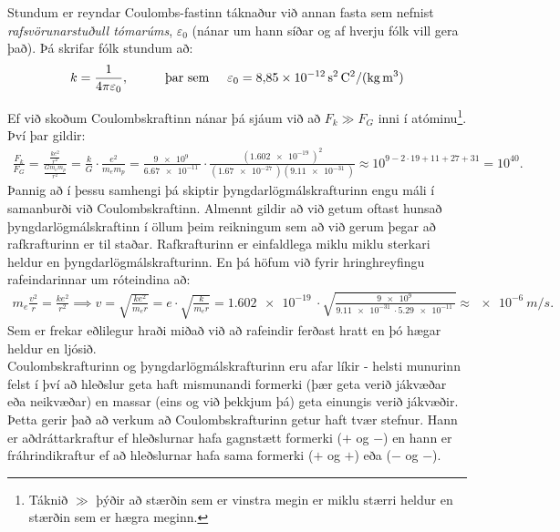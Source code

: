 \ifdefined \wholebook \else\documentclass[oneside]{book}\usepackage{EdlBook}\graphicspath{{figures/}}
\begin{document}
Stundum er reyndar Coulombs-fastinn táknaður við annan fasta sem nefnist \textit{rafsvörunarstuðull tómarúms}, $\varepsilon_0$ (nánar um hann síðar og af hverju fólk vill gera það). Þá skrifar fólk stundum að:
\begin{align*}
    k = \frac{1}{4\pi \varepsilon_0}, \hspace{1cm} \text{þar sem} \hspace{0.5cm} \varepsilon_0 = \SI{8.85e-12}{s^2.C^2/(kg.m^3)}
\end{align*}


Ef við skoðum Coulombskraftinn nánar þá sjáum við að $F_k \gg F_G$ inni í atóminu\footnote{Táknið $\gg$ þýðir að stærðin sem er vinstra megin er miklu stærri heldur en stærðin sem er hægra meginn.}. Því þar gildir:
\begin{align*}
    \frac{F_k}{F_G} = \frac{\frac{ke^2}{r^2}}{\frac{Gm_em_p}{r^2}} = \frac{k}{G} \cdot \frac{e^2}{m_e m_p} = \frac{\SI{9e9}{}}{\SI{6.67e-11}{}} \cdot \frac{(\SI{1.602e-19}{})^2}{(\SI{1.67e-27}{})(\SI{9.11e-31}{})} \approx 10^{9-2\cdot19 + 11 + 27+31} = 10^{40}.
\end{align*}
Þannig að í þessu samhengi þá skiptir þyngdarlögmálskrafturinn engu máli í samanburði við Coulombskraftinn. Almennt gildir að við getum oftast hunsað þyngdarlögmálskraftinn í öllum þeim reikningum sem að við gerum þegar að rafkrafturinn er til staðar. Rafkrafturinn er einfaldlega miklu miklu sterkari heldur en þyngdarlögmálskrafturinn. En þá höfum við fyrir hringhreyfingu rafeindarinnar um róteindina að:
\begin{align*}
    m_e \frac{v^2}{r} = \frac{ke^2}{r^2} \implies v = \sqrt{\frac{ke^2}{m_e r}} = e \cdot \sqrt{\frac{k}{m_e r}} = \SI{1.602e-19}{} \cdot \sqrt{\frac{\SI{9e9}{}}{\SI{9.11e-31}{}\cdot \SI{5.29e-11}{}}} \approx \SI{e-6}{m/s}.
\end{align*}
Sem er frekar eðlilegur hraði miðað við að rafeindir ferðast hratt en þó hægar heldur en ljósið. \\

Coulombskrafturinn og þyngdarlögmálskrafturinn eru afar líkir - helsti munurinn felst í því að hleðslur geta haft mismunandi formerki (þær geta verið jákvæðar eða neikvæðar) en massar (eins og við þekkjum þá) geta einungis verið jákvæðir. Þetta gerir það að verkum að Coulombskrafturinn getur haft tvær stefnur. Hann er aðdráttarkraftur ef hleðslurnar hafa gagnstætt formerki ($+$ og $-$) en hann er fráhrindikraftur ef að hleðslurnar hafa sama formerki ($+$ og $+$) eða ($-$ og $-$). \\
\end{document}
